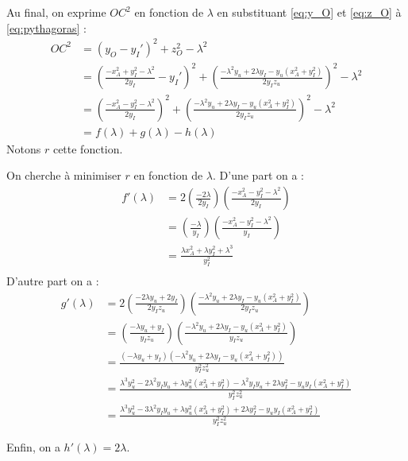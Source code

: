 \documentclass{article}
\begin{document}
\begin{enumerate}
    Au final, on exprime $OC^2$ en fonction de $\lambda$ en substituant \ref{eq:y_O} et \ref{eq:z_O} à \ref{eq:pythagoras} :
    \begin{align*}
    OC^2 &= (y_O - y_I')^2 + z_O^2 - \lambda^2 \\
         &= \left(\frac{-x_A^2 + y_I^2 - \lambda^2}{2y_I} - y_I'\right)^2 + \left(\frac{-\lambda^2y_u + 2\lambda y_I  - y_u(x_A^2 + y_I^2)}{2y_Iz_u}\right)^2 - \lambda^2 \\
          &= \left(\frac{-x_A^2 - y_I^2 - \lambda^2}{2y_I}\right)^2 + \left( \frac{-\lambda^2y_u + 2\lambda y_I  - y_u(x_A^2 + y_I^2)}{2y_Iz_u}\right)^2 - \lambda^2 \\
         &= f(\lambda) + g(\lambda) - h(\lambda)
    \end{align*}
    Notons $r$ cette fonction.
    
    On cherche à minimiser $r$ en fonction de $\lambda$.
    D'une part on a :
    \begin{align*}
        f'(\lambda) &= 2\left(\frac{-2\lambda}{2y_I}\right)\left(\frac{-x_A^2 - y_I^2 - \lambda^2}{2y_I}\right)\\
        &= \left(\frac{-\lambda}{y_I}\right)\left(\frac{-x_A^2 - y_I^2 - \lambda^2}{y_I}\right)\\
        &= \frac{\lambda x_A^2 + \lambda y_I^2 + \lambda^3}{y_I^2}\\
    \end{align*}
    D'autre part on a :
    \begin{align*}
    g'(\lambda) &= 2\left(\frac{-2\lambda y_u + 2y_I}{2y_Iz_u}\right)\left(\frac{-\lambda^2y_u + 2\lambda y_I - y_u(x_A^2 + y_I^2)}{2y_Iz_u}\right) \\
         &= \left(\frac{-\lambda y_u + y_I}{y_Iz_u}\right)\left(\frac{-\lambda^2y_u + 2\lambda y_I - y_u(x_A^2 + y_I^2)}{y_Iz_u}\right)\\
         &= \frac{(-\lambda y_u + y_I)(-\lambda^2y_u + 2\lambda y_I - y_u(x_A^2 + y_I^2))}{y_I^2z_u^2}\\
         &= \frac{\lambda^3y_u^2 - 2\lambda^2 y_Iy_u + \lambda y_u^2(x_A^2 + y_I^2) - \lambda^2y_Iy_u + 2\lambda y_I^2 - y_uy_I(x_A^2 + y_I^2)}{y_I^2z_u^2}\\
         &= \frac{\lambda^3y_u^2 - 3\lambda^2 y_Iy_u + \lambda y_u^2(x_A^2 + y_I^2) + 2\lambda y_I^2 - y_uy_I(x_A^2 + y_I^2)}{y_I^2z_u^2}
    \end{align*}
    
    Enfin, on a $h'(\lambda) = 2\lambda$.
    

\end{enumerate}
\end{document}

